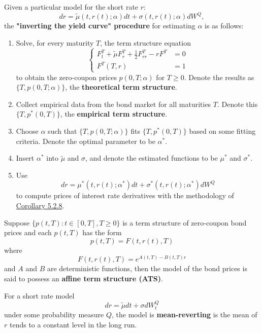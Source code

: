 \documentclass[11pt,fleqn]{book} %
\begin{document}
\begin{definition} \label{def:532}
Given a particular model for the short rate \(r\):
\[
dr = \tilde{\mu}(t, r(t); \alpha)dt + \sigma(t, r(t); \alpha)dW^Q,
\]
the \textbf{"inverting the yield curve" procedure} for estimating \(\alpha\) is as follows:
\begin{enumerate}
\item Solve, for every maturity \(T\), the term structure equation
\[
\left\{
\begin{array}{rl}
F_t^T + \tilde{\mu}F_r^T + \frac12 F_{rr}^T - rF^T &= 0 \\
F^T(T, r) &= 1
\end{array}
\right.
\]
to obtain the zero-coupon prices \(p(0, T; \alpha)\) for \(T \geq 0\). Denote the results as \(\{T, p(0, T; \alpha)\}\), the \textbf{theoretical term structure}.
\item Collect empirical data from the bond market for all maturities \(T\). Denote this \(\{T, p^*(0, T)\}\), the \textbf{empirical term structure}.
\item Choose \(\alpha\) such that \(\{T, p(0, T;\alpha)\}\) fits \(\{T, p^*(0, T)\}\) based on some fitting criteria. Denote the optimal parameter to be \(\alpha^*\).
\item Insert \(\alpha^*\) into \(\tilde{\mu}\) and \(\sigma\), and denote the estimated functions to be \(\mu^*\) and \(\sigma^*\). 
\item Use
\[
dr = \mu^*(t, r(t); \alpha^*)dt + \sigma^*(t, r(t); \alpha^*)dW^Q
\]
to compute prices of interest rate derivatives with the methodology of \hyperref[cor:528]{Corollary 5.2.8}.
\end{enumerate}
\end{definition}

\begin{definition} \label{def:533}
Suppose \(\{p(t, T): t \in [0, T], T \geq 0\}\) is a term structure of zero-coupon bond prices and each \(p(t, T)\) has the form
\[
p(t, T) = F(t, r(t), T)
\]
where
\[
F(t, r(t), T) = e^{A(t, T) - B(t, T)r}
\]
and \(A\) and \(B\) are deterministic functions, then the model of the bond prices is said to possess an \textbf{affine term structure (ATS)}.
\end{definition}

\begin{definition} \label{def:534}
For a short rate model
\[
dr = \tilde{\mu}dt + \sigma dW_t^Q
\]
under some probability measure \(Q\), the model is \textbf{mean-reverting} is the mean of \(r\) tends to a constant level in the long run.
\end{definition}
\end{document}
